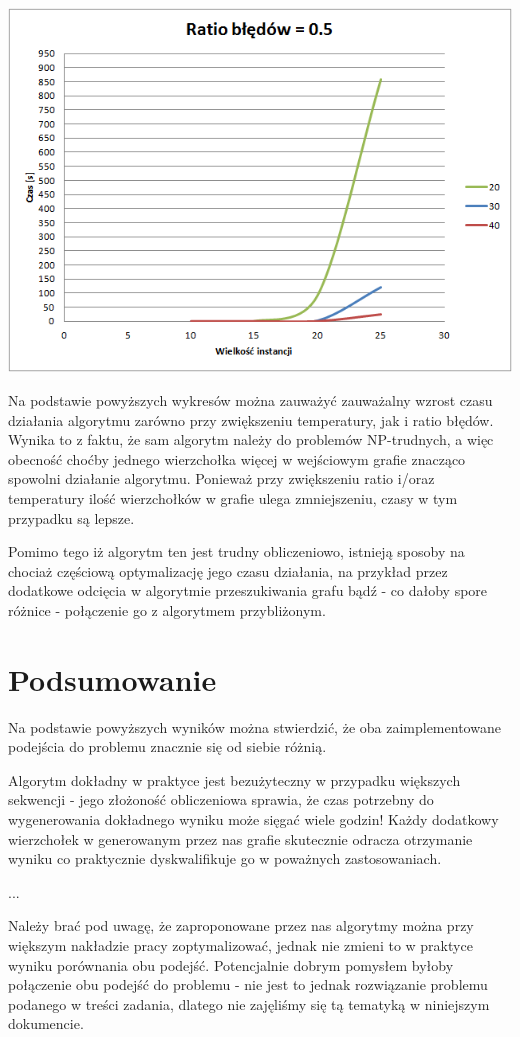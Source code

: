 \documentclass{article}
\begin{document}
\begin{center}
\includegraphics[scale=0.75]{0-5}

\end{center}

\newpage

Na podstawie powyższych wykresów można zauważyć zauważalny wzrost czasu działania algorytmu zarówno przy zwiększeniu temperatury, jak i ratio błędów. Wynika to z faktu, że sam algorytm należy do problemów NP-trudnych, a więc obecność choćby jednego wierzchołka więcej w wejściowym grafie znacząco spowolni działanie algorytmu. Ponieważ przy zwiększeniu ratio i/oraz temperatury ilość wierzchołków w grafie ulega zmniejszeniu, czasy w tym przypadku są lepsze.

Pomimo tego iż algorytm ten jest trudny obliczeniowo, istnieją sposoby na chociaż częściową optymalizację jego czasu działania, na przykład przez dodatkowe odcięcia w algorytmie przeszukiwania grafu bądź - co dałoby spore różnice - połączenie go z algorytmem przybliżonym. 

\section{Podsumowanie}

Na podstawie powyższych wyników można stwierdzić, że oba zaimplementowane podejścia do problemu znacznie się od siebie różnią.

Algorytm dokładny w praktyce jest bezużyteczny w przypadku większych sekwencji - jego złożoność obliczeniowa sprawia, że czas potrzebny do wygenerowania dokładnego wyniku może sięgać wiele godzin! Każdy dodatkowy wierzchołek w generowanym przez nas grafie skutecznie odracza otrzymanie wyniku co praktycznie dyskwalifikuje go w poważnych zastosowaniach. 

...

Należy brać pod uwagę, że zaproponowane przez nas algorytmy można przy większym nakładzie pracy zoptymalizować, jednak nie zmieni to w praktyce wyniku porównania obu podejść. Potencjalnie dobrym pomysłem byłoby połączenie obu podejść do problemu - nie jest to jednak rozwiązanie problemu podanego w treści zadania, dlatego nie zajęliśmy się tą tematyką w niniejszym dokumencie.
\end{document}

